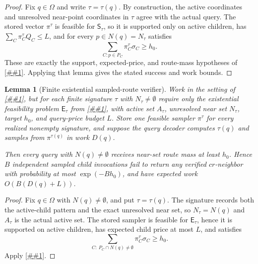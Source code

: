 \documentclass[10pt]{article}
\newcommand{\cref}[1]{\ref{##1}}
\newtheorem{lemma}[theorem]{Lemma}
\theoremstyle{definition}
\begin{document}
\begin{proof}
   Fix $q\in\Omega$ and write $\tau=\tau(q)$.  By construction, the active
   coordinates and unresolved near-point coordinates in $\tau$ agree with the
   actual query.  The stored vector $\pi^\tau$ is feasible for
   \(\mathsf S_\tau\), so it is supported only on active children,
   has $\sum_C\pi^\tau_CQ_C\le L$, and for every
   $p\in N(q)=N_\tau$ satisfies
   \[
      \sum_{C:p\in P_C}\pi^\tau_C\sigma_C\ge h_0 .
   \]
   These are exactly the support, expected-price, and route-mass hypotheses of
   \cref{lem:sampled-priced-cover}.  Applying that lemma gives the stated
   success and work bounds.
\end{proof}

\begin{lemma}[Finite existential sampled-route verifier]
   \label{lem:finite-existential-sampled-route-verifier}
   Work in the setting of \cref{lem:finite-sampled-route-verifier}, but for
   each finite signature \(\tau\) with \(N_\tau\ne\emptyset\) require only the
   existential feasibility problem \(\mathsf E_\tau\) from
   \cref{lem:finite-existential-sampled-cover-dual}, with active set
   \(A_\tau\), unresolved near set \(N_\tau\), target \(h_0\), and query-price
   budget \(L\).  Store one feasible sampler \(\pi^\tau\) for every realized
   nonempty signature, and suppose the query decoder computes \(\tau(q)\) and
   samples from \(\pi^{\tau(q)}\) in work \(D(q)\).

   Then every query with \(N(q)\ne\emptyset\) receives near-set route mass at
   least \(h_0\).  Hence \(B\) independent sampled child invocations fail to
   return any verified \(cr\)-neighbor with probability at most
   \(\exp(-Bh_0)\), and have expected work \(O(B(D(q)+L))\).
\end{lemma}

\begin{proof}
   Fix \(q\in\Omega\) with \(N(q)\ne\emptyset\), and put
   \(\tau=\tau(q)\).  The signature records both the active-child pattern and
   the exact unresolved near set, so \(N_\tau=N(q)\) and \(A_\tau\) is the
   actual active set.  The stored sampler is feasible for
   \(\mathsf E_\tau\), hence it is supported on active children, has expected
   child price at most \(L\), and satisfies
   \[
      \sum_{C:\ P_C\cap N(q)\ne\emptyset}\pi^\tau_C\sigma_C\ge h_0 .
   \]
   Apply \cref{lem:existential-sampled-priced-cover}.
\end{proof}
\end{document}
